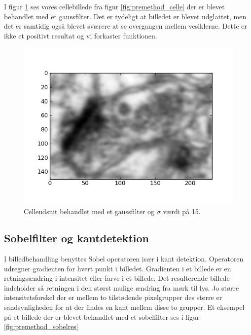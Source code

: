 I figur \ref{fig:premethod_GaussCelle} ses vores cellebillede fra figur \ref{fig:premethod_celle} der er blevet behandlet med et gaussfilter. Det er tydeligt at billedet er blevet udglattet, men det er samtidig også blevet sværere at se overgangen mellem vesiklerne. Dette er ikke et positivt resultat og vi forkaster funktionen.

\begin{figure}[H]
	\centering
	\includegraphics[scale=0.8]{files/premethod/img/gausscell.png}
	\caption{Celleudsnit behandlet med et gaussfilter og $\sigma$ værdi på 15.\label{fig:premethod_GaussCelle}}
\end{figure}


\subsection{Sobelfilter og kantdetektion}
I billedbehandling benyttes Sobel operatoren især i kant detektion. Operatoren udregner gradienten for hvert punkt i billedet. Gradienten i et billede er en retningsændring i intensitet eller farve i et billede. Det resulterende billede indeholder så retningen i den størst mulige ændring fra mørk til lys. Jo større intensitetsforskel der er mellem to tilstødende pixelgrupper des større er sandsynligheden for at der findes en kant mellem disse to grupper. Et eksempel på et billede der er blevet behandlet med et sobelfilter ses i figur \ref{fig:premethod_sobelres}


